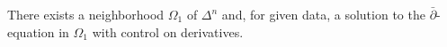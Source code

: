 
There exists a neighborhood $\Omega_1$ of $\Delta^n$ and, for given data, a solution to the $\bar{\partial}$-equation in $\Omega_1$ with control on derivatives.

